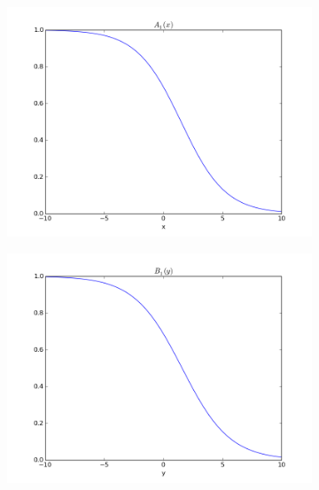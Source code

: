 \documentclass[paper=a4, fontsize=11pt]{scrartcl} %
\numberwithin{equation}{section} %
\numberwithin{figure}{section} %
\numberwithin{table}{section} %
\begin{document}
\begin{figure}[h]
\centering
\begin{subfigure}[b]{0.45\textwidth}
\includegraphics[width=\textwidth]{A_B/figure_1.png}
\end{subfigure}
\begin{subfigure}[b]{0.45\textwidth}
\includegraphics[width=\textwidth]{A_B/figure_2.png}
\end{subfigure}


\end{figure}
\end{document}
